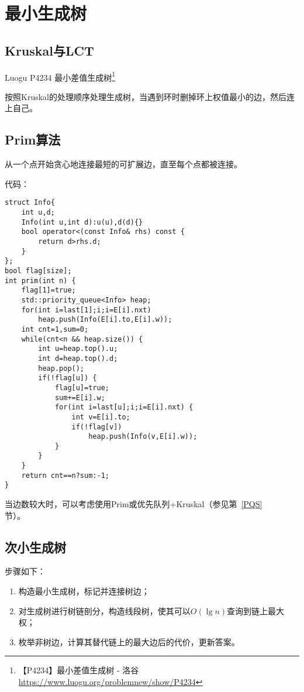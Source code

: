\section{最小生成树}
\subsection{Kruskal与LCT}
Luogu P4234 最小差值生成树\footnote{【P4234】最小差值生成树 - 洛谷
	\url{https://www.luogu.org/problemnew/show/P4234}
}

按照Kruskal的处理顺序处理生成树，当遇到环时删掉环上权值最小的边，然后连上自己。

\subsection{Prim算法}

从一个点开始贪心地连接最短的可扩展边，直至每个点都被连接。

代码：
\begin{lstlisting}
struct Info{
    int u,d;
    Info(int u,int d):u(u),d(d){}
    bool operator<(const Info& rhs) const {
        return d>rhs.d;
    }
};
bool flag[size];
int prim(int n) {
    flag[1]=true;
    std::priority_queue<Info> heap;
    for(int i=last[1];i;i=E[i].nxt)
        heap.push(Info(E[i].to,E[i].w));
    int cnt=1,sum=0;
    while(cnt<n && heap.size()) {
        int u=heap.top().u;
        int d=heap.top().d;
        heap.pop();
        if(!flag[u]) {
            flag[u]=true;
            sum+=E[i].w;
            for(int i=last[u];i;i=E[i].nxt) {
                int v=E[i].to;
                if(!flag[v])
                    heap.push(Info(v,E[i].w));
            }
        }
    }
    return cnt==n?sum:-1;
}
\end{lstlisting}

当边数较大时，可以考虑使用Prim或优先队列+Kruskal（参见第~\ref{PQS}\\节）。

\subsection{次小生成树}
步骤如下：
\begin{enumerate}
	\item 构造最小生成树，标记并连接树边；
	\item 对生成树进行树链剖分，构造线段树，使其可以$O(\lg n)$查询到链上最大权；
	\item 枚举非树边，计算其替代链上的最大边后的代价，更新答案。
\end{enumerate}


